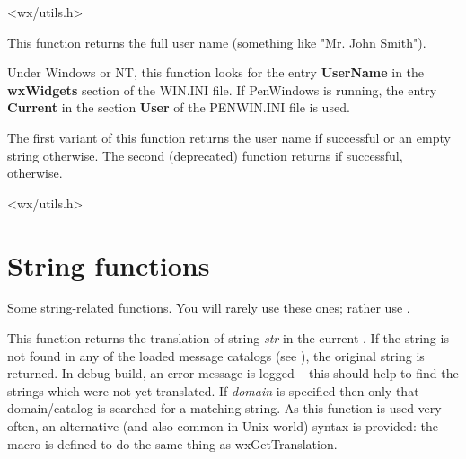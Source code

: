 


<wx/utils.h>


\label{wxgetusername}



This function returns the full user name (something like "Mr. John Smith").

Under Windows or NT, this function looks for the entry {\bf UserName}\rtfsp
in the {\bf wxWidgets} section of the WIN.INI file. If PenWindows
is running, the entry {\bf Current} in the section {\bf User} of
the PENWIN.INI file is used.

The first variant of this function returns the user name if successful or an
empty string otherwise. The second (deprecated) function returns \true
if successful, \false otherwise.




<wx/utils.h>



\section{String functions}\label{stringfunctions}

Some string-related functions. You will rarely use these ones; rather use .

\label{wxgettranslation}



This function returns the translation of string {\it str} in the current
. If the string is not found in any of the loaded
message catalogs (see ), the
original string is returned. In debug build, an error message is logged -- this
should help to find the strings which were not yet translated.  If
{\it domain} is specified then only that domain/catalog is searched
for a matching string.  As this function
is used very often, an alternative (and also common in Unix world) syntax is
provided: the  macro is defined to do the same thing
as wxGetTranslation.


